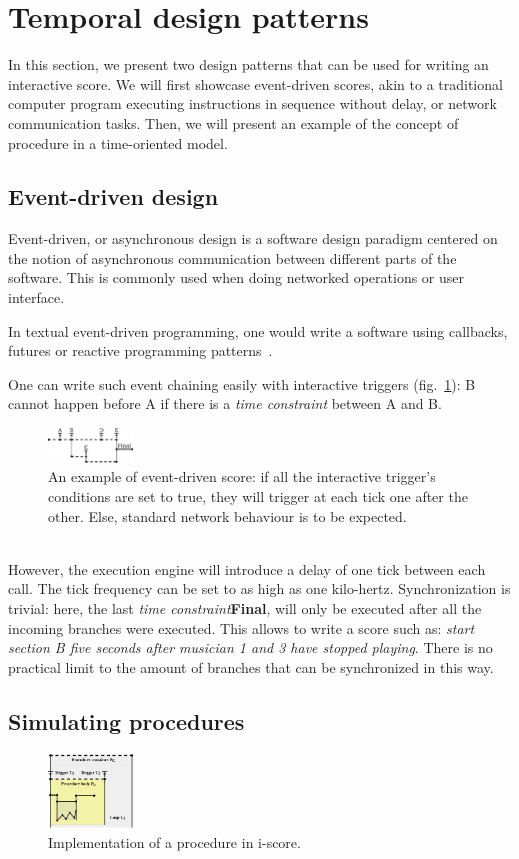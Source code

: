 \documentclass{article}
\newcommand{\timeconstraint}{\textit{time constraint}\xspace}
\begin{document}
\section{Temporal design patterns}
In this section, we present two design patterns that can be used 
for writing an interactive score.
We will first showcase event-driven scores, akin to a traditional computer program executing instructions in sequence without delay, or network communication tasks.
Then, we will present an example of the concept of procedure in a time-oriented model.
\subsection{Event-driven design}
Event-driven, or asynchronous design is a software design 
paradigm centered on the notion of asynchronous 
communication between different parts of the software.
This is commonly used when doing networked operations or 
user interface.

In textual event-driven programming, one would write a software 
using callbacks, futures or reactive programming patterns~\cite{kambona2013evaluation}. 

One can write such event chaining easily with interactive triggers (fig.~\ref{fig.event}): 
B cannot happen before A if there is a \timeconstraint between A and B. 
\begin{figure}[h]
	\centering
	\includegraphics[width=0.20\textwidth]{images/event.eps}
	\caption{An example of event-driven score: if all the interactive trigger's conditions are set to true, they will trigger at each tick one after the other. Else, standard network behaviour is to be expected.}
	\label{fig.event}
\end{figure}~\\
However, the execution engine will introduce a delay of one tick between each call.
The tick frequency can be set to as high as one kilo-hertz.
Synchronization is trivial: here, the last \timeconstraint \textbf{Final}, will 
only be executed after all the incoming branches were executed. 
This allows to write a score such as: \emph{start section B five seconds after musician 1 and 3 
have stopped playing}.
There is no practical limit to the amount of branches that can be synchronized in this way.
\subsection{Simulating procedures}
\vspace{-3mm}
\begin{figure}[h]
\centering
\includegraphics[width=0.20\textwidth]{images/function.eps}
\caption{Implementation of a procedure in i-score.}
\label{fig.function}
\end{figure}
\end{document}
